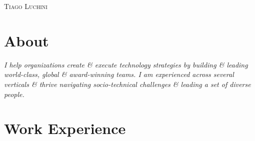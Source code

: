 \documentclass[a4paper,10pt]{article}
\begin{document}
\pagestyle{fancy} %

\fancyhf{}

\renewcommand{\headrulewidth}{0pt}
\renewcommand{\footrulewidth}{1pt}


\par{\centering
  {\Huge\textsc{Tiago Luchini}}\smallskip\par}




\section{About}
\emph{I help organizations create \& execute technology strategies by
building \& leading world-class, global \& award-winning teams. I am
experienced across several verticals \& thrive navigating
socio-technical challenges \& leading a set of diverse people.}

\section{Work Experience}
\end{document}
